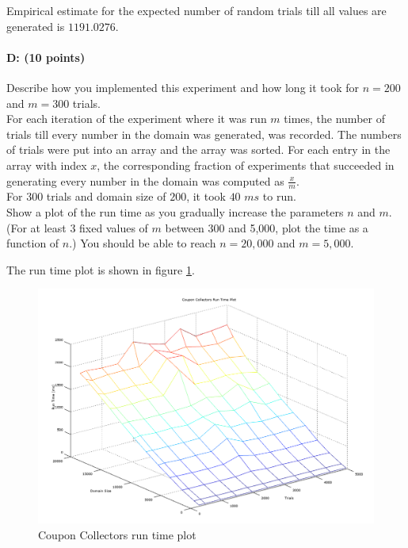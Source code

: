 \documentclass[11pt]{article}
\begin{document}
Empirical estimate for the expected number of random trials till all values are generated is $1191.0276$.

\paragraph{D: (10 points)} 
Describe how you implemented this experiment and how long it took for $n=200$ and $m=300$ trials.  \\

For each iteration of the experiment where it was run $m$ times, the number of trials till every number in the domain was generated, was recorded. The numbers of trials were put into an array and the array was sorted. For each entry in the array with index $x$, the corresponding fraction of experiments that succeeded in generating every number in the domain was computed as $\frac{x}{m}$.\\

For $300$ trials and domain size of $200$, it took $40$ $ms$ to run.\\

Show a plot of the run time as you gradually increase the parameters $n$ and $m$.  
(For at least 3 fixed values of $m$ between 300 and 5,000, plot the time as a function of $n$.)
You should be able to reach $n = 20{,}000$ and $m = 5{,}000$.  

The run time plot is shown in figure \ref{ccruntimes}.

\begin{figure}[!htb]
\centering
\includegraphics[width=5.5in]{figures/ccruntimes.png}
\caption{Coupon Collectors run time plot}
\label{ccruntimes}
\end{figure}
\end{document}
